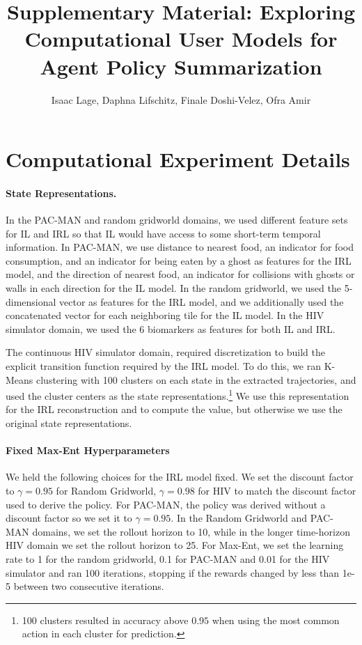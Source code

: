 \documentclass{article}
\title{Supplementary Material: Exploring Computational User Models for Agent Policy Summarization}
\date{}
\author{
Isaac Lage, 
Daphna Lifschitz,
Finale Doshi-Velez,
Ofra Amir
}
\begin{document}
\maketitle

\section{Computational Experiment Details}

\paragraph{State Representations.} 
In the PAC-MAN and random gridworld domains, we used different feature sets for IL and IRL so that IL would have access to some short-term temporal information. In PAC-MAN, we use distance to nearest food, an indicator for food consumption, and an indicator for being eaten by a ghost as features for the IRL model, and the direction of nearest food, an indicator for collisions with ghosts or walls in each direction for the IL model. In the random gridworld, we used the 5-dimensional vector as features for the IRL model, and we additionally used the concatenated vector for each neighboring tile for the IL model. In the HIV simulator domain, we used the 6 biomarkers as features for both IL and IRL. 

The continuous HIV simulator domain, required discretization to build the explicit transition function required by the IRL model. To do this, we ran K-Means clustering with 100 clusters on each state in the extracted trajectories, and used the cluster centers as the state representations.\footnote{100 clusters resulted in accuracy above $0.95$ when using the most common action in each cluster for prediction.} We use this representation for the IRL reconstruction and to compute the value, but otherwise we use the original state representations.

\paragraph{Fixed Max-Ent Hyperparameters}

We held the following choices for the IRL model fixed. We set the discount factor to $\gamma = 0.95$ for Random Gridworld, $\gamma = 0.98$ for HIV to match the discount factor used to derive the policy.  For PAC-MAN, the policy was derived without a discount factor so we set it to $\gamma = 0.95$. In the Random Gridworld and PAC-MAN domains, we set the rollout horizon to 10, while in the longer time-horizon HIV domain we set the rollout horizon to 25. For Max-Ent, we set the learning rate to 1 for the random gridworld, 0.1 for PAC-MAN and 0.01 for the HIV simulator and ran 100 iterations, stopping if the rewards changed by less than 1e-5 between two consecutive iterations.
\end{document}
